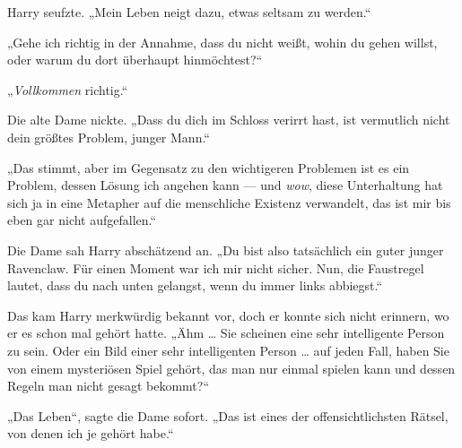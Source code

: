 Harry seufzte.
„Mein Leben neigt dazu, etwas seltsam zu werden.“

„Gehe ich richtig in der Annahme, dass du nicht weißt, wohin du gehen willst, oder warum du dort überhaupt hinmöchtest?“

„\emph{Vollkommen} richtig.“

Die alte Dame nickte.
„Dass du dich im Schloss verirrt hast, ist vermutlich nicht dein größtes Problem, junger Mann.“

„Das stimmt, aber im Gegensatz zu den wichtigeren Problemen ist es ein Problem, dessen Lösung ich angehen kann — und \emph{wow}, diese Unterhaltung hat sich ja in eine Metapher auf die menschliche Existenz verwandelt, das ist mir bis eben gar nicht aufgefallen.“

Die Dame sah Harry abschätzend an.
„Du bist also tatsächlich ein guter junger Ravenclaw. Für einen Moment war ich mir nicht sicher. Nun, die Faustregel lautet, dass du nach unten gelangst, wenn du immer links abbiegst.“

Das kam Harry merkwürdig bekannt vor, doch er konnte sich nicht erinnern, wo er es schon mal gehört hatte. „Ähm … Sie scheinen eine sehr intelligente Person zu sein. Oder ein Bild einer sehr intelligenten Person … auf jeden Fall, haben Sie von einem mysteriösen Spiel gehört, das man nur einmal spielen kann und dessen Regeln man nicht gesagt bekommt?“

„Das Leben“, sagte die Dame sofort.
„Das ist eines der offensichtlichsten Rätsel, von denen ich je gehört habe.“

